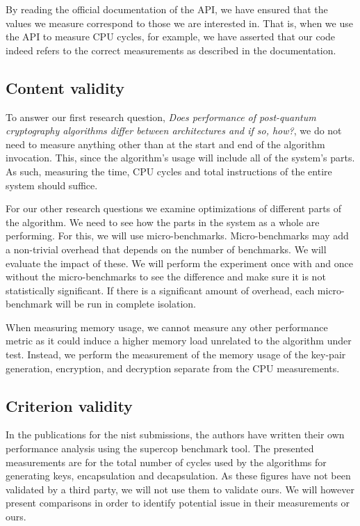 By reading the official documentation of the API, we have ensured that the values we measure correspond to those we are interested in. That is, when we use the API to measure CPU cycles, for example, we have asserted that our code indeed refers to the correct measurements as described in the documentation.

\subsection{Content validity}


To answer our first research question, \textit{Does performance of post-quantum cryptography algorithms differ between architectures and if so, how?},  we do not need to measure anything other than at the start and end of the algorithm invocation. This, since the algorithm's usage will include all of the system's parts. As such, measuring the time, CPU cycles and total instructions of the entire system should suffice.

For our other research questions we examine optimizations of different parts of the algorithm. We need to see how the parts in the system as a whole are performing. For this, we will use micro-benchmarks. Micro-benchmarks may add a non-trivial overhead that depends on the number of benchmarks. We will evaluate the impact of these. We will perform the experiment once with and once without the micro-benchmarks to see the difference and make sure it is not statistically significant. If there is a significant amount of overhead, each micro-benchmark will be run in complete isolation.

When measuring memory usage, we cannot measure any other performance metric as it could induce a higher memory load unrelated to the algorithm under test. Instead, we perform the measurement of the memory usage of the key-pair generation, encryption, and decryption separate from the CPU measurements.

\subsection{Criterion validity}
In the publications for the \gls{nist} submissions, the authors have written their own performance analysis using the \gls{supercop} benchmark tool. The presented measurements are for the total number of cycles used by the algorithms for generating keys, encapsulation and decapsulation. As these figures have not been validated by a third party, we will not use them to validate ours. We will however present comparisons in order to identify potential issue in their measurements or ours.


